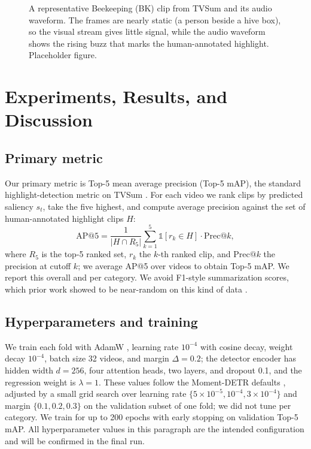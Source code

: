 \documentclass[10pt,twocolumn,letterpaper]{article}
\begin{document}
\begin{figure}[t]
\begin{center}
\fbox{\rule{0pt}{1.4in} \rule{0.9\linewidth}{0pt}}
\end{center}
   \caption{A representative Beekeeping (BK) clip from TVSum and its audio waveform. The frames are nearly static (a person beside a hive box), so the visual stream gives little signal, while the audio waveform shows the rising buzz that marks the human-annotated highlight. Placeholder figure.}
\label{fig:data}
\end{figure}

\section{Experiments, Results, and Discussion}

\subsection{Primary metric}
Our primary metric is Top-5 mean average precision (Top-5 mAP), the standard highlight-detection metric on TVSum \cite{momentdetr}. For each video we rank clips by predicted saliency $s_t$, take the five highest, and compute average precision against the set of human-annotated highlight clips $H$:
\begin{equation}
  \mathrm{AP@5} = \frac{1}{|H \cap R_5|}\sum_{k=1}^{5} \mathbb{1}[r_k \in H]\cdot \mathrm{Prec}@k,
\end{equation}
where $R_5$ is the top-5 ranked set, $r_k$ the $k$-th ranked clip, and $\mathrm{Prec}@k$ the precision at cutoff $k$; we average AP@5 over videos to obtain Top-5 mAP. We report this overall and per category. We avoid F1-style summarization scores, which prior work showed to be near-random on this kind of data \cite{otani}.

\subsection{Hyperparameters and training}
We train each fold with AdamW \cite{adamw}, learning rate $10^{-4}$ with cosine decay, weight decay $10^{-4}$, batch size 32 videos, and margin $\Delta = 0.2$; the detector encoder has hidden width $d = 256$, four attention heads, two layers, and dropout 0.1, and the regression weight is $\lambda = 1$. These values follow the Moment-DETR defaults \cite{momentdetr}, adjusted by a small grid search over learning rate $\{5\!\times\!10^{-5}, 10^{-4}, 3\!\times\!10^{-4}\}$ and margin $\{0.1, 0.2, 0.3\}$ on the validation subset of one fold; we did not tune per category. We train for up to 200 epochs with early stopping on validation Top-5 mAP. All hyperparameter values in this paragraph are the intended configuration and will be confirmed in the final run.
\end{document}
